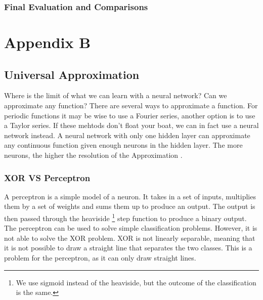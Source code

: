 \documentclass[twoside,11pt]{report}
\begin{document}
\subsection*{Final Evaluation and Comparisons}
\label{sec:comparisons2}


















\chapter*{Appendix B}
\label{app:appendix}


\section{Universal Approximation}
\label{sec:UAT}

Where is the limit of what we can learn with a neural network? Can we approximate any function?
There are several ways to approximate a function. For periodic functions it may be wise to use a Fourier series,
another option is to use a Taylor series. If these mehtods don't float your boat, we can in fact use a neural network
instead. A neural network with only one hidden layer can approximate any continuous function
given enough neurons in the hidden layer. The more neurons, the higher the resolution of the Approximation
\cite{HornikEtAl89}. 

\subsection*{XOR VS Perceptron}
\label{app:xor}

A perceptron is a simple model of a neuron. It takes in a set of inputs, multiplies them by a set of weights 
and sums them up to produce an output. The output is then passed through the heaviside
\footnote{We use sigmoid instead of the heaviside, but the outcome of the classification is the same.}
step function to produce
a binary output. The perceptron can be used to solve simple classification problems. However, it is not able to
solve the XOR problem. XOR is not linearly separable, meaning that it is not possible to draw a straight line
that separates the two classes. This is a problem for the perceptron, as it can only draw straight lines.
\end{document}
